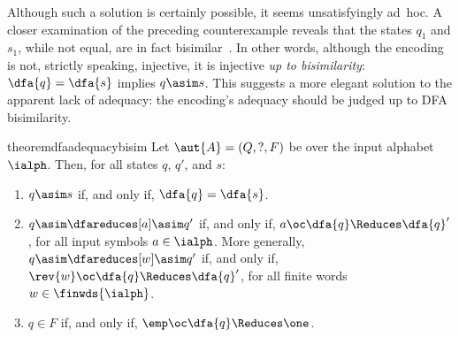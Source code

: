 Although such a solution is certainly possible, it seems unsatisfyingly ad~hoc.
A closer examination of the preceding counterexample reveals that the states $q_1$ and $s_1$, while not equal, are in fact bisimilar~.
In other words, although the encoding is not, strictly speaking, injective, it is injective \emph{up to bisimilarity}: $\dfa{q} = \dfa{s}$ implies $q \asim s$.
This suggests a more elegant solution to the apparent lack of adequacy: the encoding's adequacy should be judged up to \ac{DFA} bisimilarity.
%
\renewcommand{\dfaadequacybisimbody}{%
  Let $\aut{A} = (Q, ?, F)$ be \iac{DFA} over the input alphabet $\ialph$.
  Then, for all states $q$, $q'$, and $s$:
  \begin{enumerate}
  \item\label{enum:ordered-rewriting:dfa-adequacy:1}
    $q \asim s$ if, and only if, $\dfa{q} = \dfa{s}$.
  \item\label{enum:ordered-rewriting:dfa-adequacy:2}
    $q \asim\dfareduces[a]\asim q'$ if, and only if, $a \oc \dfa{q} \Reduces \dfa{q}'$, for all input symbols $a \in \ialph$.    
    More generally, $q \asim\dfareduces[w]\asim q'$ if, and only if, $\rev{w} \oc \dfa{q} \Reduces \dfa{q}'$, for all finite words $w \in \finwds{\ialph}$.
  \item\label{enum:ordered-rewriting:dfa-adequacy:3}
    $q \in F$ if, and only if, $\emp \oc \dfa{q} \Reduces \one$.
  \end{enumerate}%
}%
%  
\begin{restatable*}[
  name=\ac*{DFA} adequacy up to bisimilarity,
  label=thm:ordered-rewriting:dfa-adequacy-bisim
]{theorem}{dfaadequacybisim}
  \dfaadequacybisimbody
\end{restatable*}

